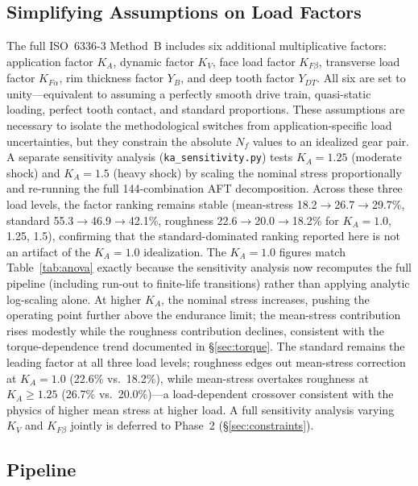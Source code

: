 \documentclass[twocolumn,12pt,a4paper]{article}
\begin{document}
\subsection{Simplifying Assumptions on Load Factors}
\label{sec:load_factors}

The full ISO~6336-3 Method~B includes six additional multiplicative
factors: application factor $K_A$, dynamic factor $K_V$, face load
factor $K_{F\beta}$, transverse load factor $K_{F\alpha}$, rim
thickness factor $Y_B$, and deep tooth factor $Y_{DT}$. All six are set
to unity---equivalent to assuming a perfectly smooth drive train,
quasi-static loading, perfect tooth contact, and standard proportions.
These assumptions are necessary to isolate the methodological switches
from application-specific load uncertainties, but they constrain the
absolute $N_f$ values to an idealized gear pair. A separate sensitivity
analysis (\texttt{ka\_sensitivity.py}) tests $K_A = 1.25$ (moderate
shock) and $K_A = 1.5$ (heavy shock) by scaling the nominal stress
proportionally and re-running the full 144-combination AFT
decomposition. Across these three load levels, the factor ranking
remains stable (mean-stress 18.2$\rightarrow$26.7$\rightarrow$29.7\%,
standard 55.3$\rightarrow$46.9$\rightarrow$42.1\%, roughness
22.6$\rightarrow$20.0$\rightarrow$18.2\% for $K_A=1.0$, 1.25, 1.5),
confirming that the standard-dominated ranking reported here is not an
artifact of the $K_A=1.0$ idealization. The $K_A=1.0$ figures match
Table~\ref{tab:anova} exactly because the sensitivity analysis now
recomputes the full pipeline (including run-out to finite-life
transitions) rather than applying analytic log-scaling alone. At
higher $K_A$, the nominal stress increases,
pushing the operating point further above the endurance limit; the
mean-stress contribution rises modestly while the roughness
contribution declines, consistent with the torque-dependence trend
documented in \S\ref{sec:torque}. The standard remains the leading
factor at all three load levels; roughness edges out mean-stress
correction at $K_A=1.0$ (22.6\% vs.\ 18.2\%), while mean-stress
overtakes roughness at $K_A \geq 1.25$ (26.7\% vs.\ 20.0\%)---a
load-dependent crossover consistent with the physics of higher mean
stress at higher load. A full sensitivity analysis
varying $K_V$ and $K_{F\beta}$ jointly is deferred to Phase~2
(\S\ref{sec:constraints}).

\subsection{Pipeline}
\end{document}
